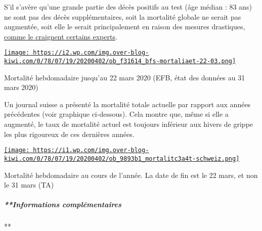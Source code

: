 S'il s'avère qu'une grande partie des décès positifs au test (âge médian
: 83 ans) ne sont pas des décès supplémentaires, soit la mortalité
globale ne serait pas augmentée, soit elle le serait principalement en
raison des mesures drastiques,
\href{https://swprs.org/open-letter-from-professor-sucharit-bhakdi-to-german-chancellor-dr-angela-merkel/}{comme
le craignent certains experts}.

\href{http://img.over-blog-kiwi.com/0/78/07/19/20200402/ob_f31614_bfs-mortaliaet-22-03.png\#width=600\&height=400}{\texttt{[image: https://i2.wp.com/img.over-blog-kiwi.com/0/78/07/19/20200402/ob\_f31614\_bfs-mortaliaet-22-03.png]}}

Mortalité hebdomadaire jusqu'au 22 mars 2020 (EFB, état des données au
31 mars 2020)

Un journal suisse a présenté la mortalité totale actuelle par rapport
aux années précédentes (voir graphique ci-dessous). Cela montre que,
même si elle a augmenté, le taux de mortalité actuel est toujours
inférieur aux hivers de grippe les plus rigoureux de ces dernières
années.

\href{http://img.over-blog-kiwi.com/0/78/07/19/20200402/ob_9893b1_mortalitc3a4t-schweiz.png\#width=1443\&height=679}{\texttt{[image: https://i1.wp.com/img.over-blog-kiwi.com/0/78/07/19/20200402/ob\_9893b1\_mortalitc3a4t-schweiz.png]}}

Mortalité hebdomadaire au cours de l'année. La date de fin est le 22
mars, et non le 31 mars (TA)

\hypertarget{informations-compluxe9mentaires-1}{%
\subparagraph{**Informations
complémentaires}\label{informations-compluxe9mentaires-1}}

**

